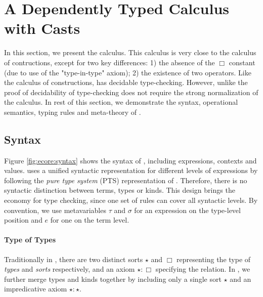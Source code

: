 
\section{A Dependently Typed Calculus with Casts}\label{sec:ecore}

In this section, we present the \ecore calculus. This calculus is very 
close to the calculus of contructions, except for two key differences: 
1) the absence of the $\Box$ constant (due to use of the "type-in-type"
axiom); 2) the existence of two \cast operators. Like the calculus 
of constructions, \ecore has decidable type-checking. However, unlike
\cc the proof of decidability of type-checking does not require 
the strong normalization of the calculus. 
In rest of this
section, we demonstrate the syntax, operational semantics, typing
rules and meta-theory of \ecore.


\subsection{Syntax}\label{sec:ecore:syn}

Figure \ref{fig:ecore:syntax} shows the syntax of \ecore, including
expressions, contexts and values. \ecore uses a unified syntactic
representation for different levels of expressions by following the
\emph{pure type system} (PTS) representation of \cc. Therefore, there
is no syntactic distinction between terms, types or kinds. This design
brings the economy for type checking, since one set of rules can cover
all syntactic levels. By convention, we use metavariables $\tau$ and
$\sigma$ for an expression on the type-level position and $e$ for one
on the term level.

\paragraph{Type of Types}
Traditionally in \cc, there are two distinct
sorts $\star$ and $\Box$ representing the type of
\emph{types} and \emph{sorts} respectively, and an axiom
$\star:\Box$ specifying the relation. In \ecore, we further
merge types and kinds together by including only a single sort
$\star$ and an impredicative axiom $\star:\star$. 


